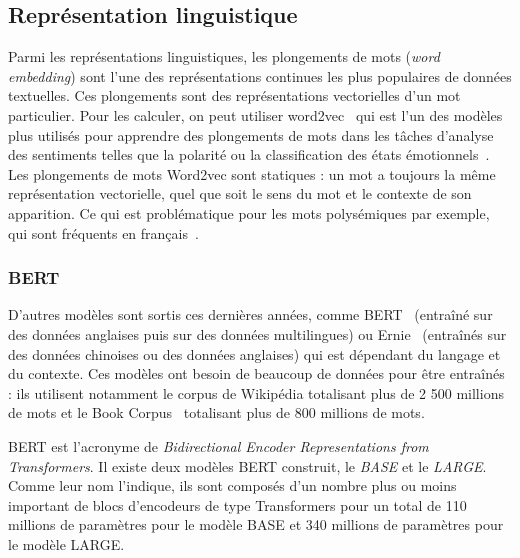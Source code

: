 \subsection{Représentation linguistique}
Parmi les représentations linguistiques, les plongements de mots (\textit{word embedding}) sont l'une des représentations continues les plus populaires de données textuelles. Ces plongements sont des représentations vectorielles d'un mot particulier. Pour les calculer, on peut utiliser word2vec~\cite{word2vec} qui est l'un des modèles plus utilisés pour apprendre des plongements de mots dans les tâches d'analyse des sentiments telles que la polarité ou la classification des états émotionnels~\cite{Rodrigo2020,Dong2018}. Les plongements de mots Word2vec sont statiques : un mot a toujours la même représentation vectorielle, quel que soit le sens du mot et le contexte de son apparition. Ce qui est problématique pour les mots polysémiques par exemple, qui sont fréquents en français~\cite{Pustejovsky1996}.

\subsubsection{BERT}
D'autres modèles sont sortis ces dernières années, comme BERT~\cite{Devlin2019} (entraîné sur des données anglaises puis sur des données multilingues) ou Ernie~\cite{Zhang2019Ernie} (entraînés sur des données chinoises ou des données anglaises) qui est dépendant du langage et du contexte. Ces modèles ont besoin de beaucoup de données pour être entraînés : ils utilisent notamment le corpus de Wikipédia totalisant plus de 2 500 millions de mots et le Book Corpus~\cite{Zhu2015} totalisant plus de 800 millions de mots.

BERT est l’acronyme de \textit{Bidirectional Encoder Representations from Transformers}. Il existe deux modèles BERT construit, le \textit{BASE} et le \textit{LARGE}. Comme leur nom l'indique, ils sont composés d'un nombre plus ou moins important de blocs d'encodeurs de type Transformers pour un total de 110 millions de paramètres pour le modèle BASE et 340 millions de paramètres pour le modèle LARGE.

